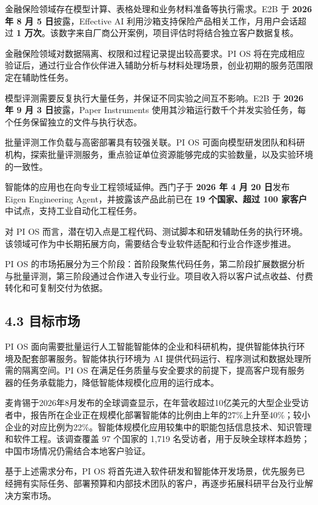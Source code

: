金融保险领域存在模型计算、表格处理和业务材料准备等执行需求。E2B 于 \textbf{2026 年 8 月 5 日}披露，Effective AI 利用沙箱支持保险产品相关工作，月用户会话超过 \textbf{1 万次}。该数字来自厂商公开案例，项目评估时将结合独立客户数据复核。

金融保险领域对数据隔离、权限和过程记录提出较高要求。PI OS 将在完成相应验证后，通过行业合作伙伴进入辅助分析与材料处理场景，创业初期的服务范围限定在辅助性任务。


模型评测需要反复执行大量任务，并保证不同实验之间互不影响。E2B 于 \textbf{2026 年 9 月 3 日}披露，Paper Instruments 使用其沙箱运行数千个并发实验任务，每个任务保留独立的文件与执行状态。

批量评测工作负载与高密部署具有较强关联。PI OS 可面向模型研发团队和科研机构，探索批量评测服务，重点验证单位资源能够完成的实验数量，以及实验环境的一致性。


智能体的应用也在向专业工程领域延伸。西门子于 \textbf{2026 年 4 月 20 日}发布 Eigen Engineering Agent，并披露该产品此前已在 \textbf{19 个国家、超过 100 家客户}中试点，支持工业自动化工程任务。

对 PI OS 而言，潜在切入点是工程代码、测试脚本和研发辅助任务的执行环境。该领域可作为中长期拓展方向，需要结合专业软件适配和行业合作逐步推进。

PI OS 的市场拓展分为三个阶段：首阶段聚焦代码任务，第二阶段扩展数据分析与批量评测，第三阶段通过合作进入专业行业。项目收入将以客户试点收益、付费转化和可复制交付为依据。

\subsection{4.3 目标市场}\label{ux76eeux6807ux5e02ux573a}

PI OS 面向需要批量运行人工智能智能体的企业和科研机构，提供智能体执行环境及配套部署服务。智能体执行环境为 AI 提供代码运行、程序测试和数据处理所需的隔离空间。PI OS 在满足任务质量与安全要求的前提下，提高客户现有服务器的任务承载能力，降低智能体规模化应用的运行成本。

麦肯锡于2026年8月发布的全球调查显示，在年营收超过10亿美元的大型企业受访者中，报告所在企业正在规模化部署智能体的比例由上年的27\%上升至40\%；较小企业的对应比例为22\%。智能体规模化应用较集中的职能包括信息技术、知识管理和软件工程。该调查覆盖 97 个国家的 1,719 名受访者，用于反映全球样本趋势；中国市场情况仍需结合本地客户验证。

基于上述需求分布，PI OS 将首先进入软件研发和智能体开发场景，优先服务已经拥有实际任务、部署预算和内部技术团队的客户，再逐步拓展科研平台及行业解决方案市场。

